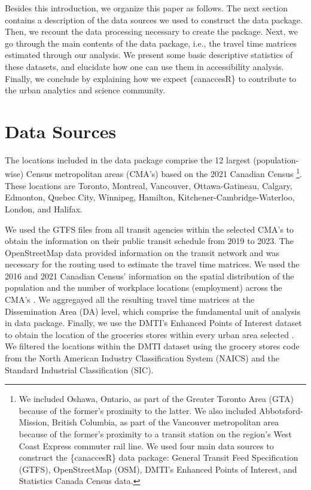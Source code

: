 \documentclass[Royal,times,sageh]{sagej}
\begin{document}
Besides this introduction, we organize this paper as follows. The next
section contains a description of the data sources we used to construct
the data package. Then, we recount the data processing necessary to
create the package. Next, we go through the main contents of the data
package, i.e., the travel time matrices estimated through our analysis.
We present some basic descriptive statistics of these datasets, and
elucidate how one can use them in accessibility analysis. Finally, we
conclude by explaining how we expect \{canaccesR\} to contribute to the
urban analytics and science community.

\section{Data Sources}\label{data-sources}

The locations included in the data package comprise the 12 largest
(population-wise) Census metropolitan areas (CMA's) based on the 2021
Canadian Census \citep{governmentofcanada2021CensusPopulation2021}
\footnote{We included Oshawa, Ontario, as part of the Greater Toronto
  Area (GTA) because of the former's proximity to the latter. We also
  included Abbotsford-Mission, British Columbia, as part of the
  Vancouver metropolitan area because of the former's proximity to a
  transit station on the region's West Coast Express commuter rail line.
  We used four main data sources to construct the \{canaccesR\} data
  package: General Transit Feed Specification (GTFS), OpenStreetMap
  (OSM), DMTI's Enhanced Points of Interest, and Statistics Canada
  Census data.}. These locations are Toronto, Montreal, Vancouver,
Ottawa-Gatineau, Calgary, Edmonton, Quebec City, Winnipeg, Hamilton,
Kitchener-Cambridge-Waterloo, London, and Halifax.

We used the GTFS files from all transit agencies within the selected
CMA's to obtain the information on their public transit schedule from
2019 to 2023. The OpenStreetMap data provided information on the transit
network and was necessary for the routing used to estimate the travel
time matrices. We used the 2016 and 2021 Canadian Census' information on
the spatial distribution of the population and the number of workplace
locations (employment) across the CMA's
\citep[governmentofcanada2021CensusPopulation2021]{governmentofcanada2016CensusPopulation2016}.
We aggregayed all the resulting travel time matrices at the
Dissemination Area (DA) level, which comprise the fundamental unit of
analysis in data package. Finally, we use the DMTI's Enhanced Points of
Interest dataset to obtain the location of the groceries stores within
every urban area selected
\citep{dmtispatialincEnhancedPointsInterest2015}. We filtered the
locations within the DMTI dataset using the grocery stores code from the
North American Industry Classification System (NAICS) and the Standard
Industrial Classification (SIC).
\end{document}
